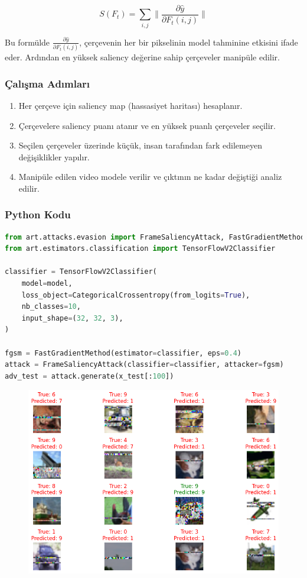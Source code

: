 \[ S(F_t) = \sum_{i,j} \| \frac{\partial \hat{y}}{\partial F_t(i, j)} \| \]

Bu formülde $\frac{\partial \hat{y}}{\partial F_t(i, j)}$, çerçevenin her bir pikselinin model tahminine etkisini ifade eder. Ardından en yüksek saliency değerine sahip çerçeveler manipüle edilir.

\subsubsection{Çalışma Adımları}

\begin{enumerate}
    \item Her çerçeve için saliency map (hassasiyet haritası) hesaplanır. 
    \item Çerçevelere saliency puanı atanır ve en yüksek puanlı çerçeveler seçilir.
    \item Seçilen çerçeveler üzerinde küçük, insan tarafından fark edilemeyen değişiklikler yapılır.
    \item Manipüle edilen video modele verilir ve çıktının ne kadar değiştiği analiz edilir.
\end{enumerate}

\subsubsection{Python Kodu}

\begin{lstlisting}[language=Python]
from art.attacks.evasion import FrameSaliencyAttack, FastGradientMethod
from art.estimators.classification import TensorFlowV2Classifier

classifier = TensorFlowV2Classifier(
    model=model,
    loss_object=CategoricalCrossentropy(from_logits=True),
    nb_classes=10,
    input_shape=(32, 32, 3),
)

fgsm = FastGradientMethod(estimator=classifier, eps=0.4)
attack = FrameSaliencyAttack(classifier=classifier, attacker=fgsm)
adv_test = attack.generate(x_test[:100])
\end{lstlisting}

\begin{figure}[h]
    \centering
    \includegraphics[width=1\textwidth]{images/frame_saliency_attack_results.png}
    \caption{}
\end{figure}

